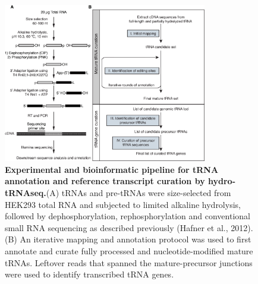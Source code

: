 \documentclass[12pt]{rockefeller}
\begin{document}
\begin{figure}[!ht]%
\centering
\includegraphics[width=3.5in]{paper1.png}%
\caption[Experimental and bioinformatic pipeline for tRNA annotation and reference transcript curation by hydro-tRNAseq]{\textbf{Experimental and bioinformatic pipeline for tRNA annotation and reference transcript curation by hydro-tRNAseq.}(A) tRNAs and pre-tRNAs were size-selected from HEK293 total RNA and subjected to limited alkaline hydrolysis, followed by dephosphorylation, rephosphorylation and conventional small RNA sequencing as described previously (Hafner et al., 2012). (B) An iterative mapping and annotation protocol was used to first annotate and curate fully processed and nucleotide-modified mature tRNAs. Leftover reads that spanned the mature-precursor junctions were used to identify transcribed tRNA genes.}
\centering
\label{paper1}%
\end{figure}
\end{document}
